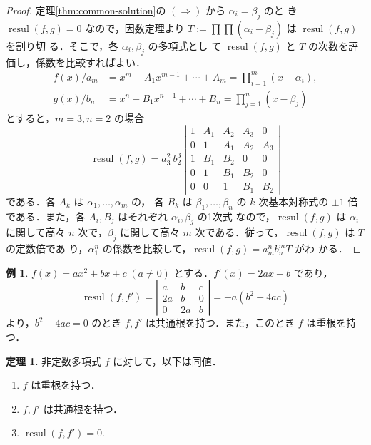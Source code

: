 \documentclass[12pt, uplatex, dvipdfmx]{jsarticle}
\theoremstyle{definition}
\newtheorem{theorem}{定理}
\newtheorem{example}{例}
\DeclareMathOperator{\resul}{resul}
\begin{document}
\begin{proof}
  定理\ref{thm:common-solution}の $(\Rightarrow)$ から $\alpha_i=\beta_j$ のと
  き $\resul(f,g)=0$ なので，因数定理より $T:=\prod \prod (\alpha_i-\beta_j)$ は $\resul(f,g)$ を割り切
  る．そこで，各 $\alpha_i, \beta_j$ の多項式とし
  て $\resul(f,g)$ と $T$ の次数を評価し，係数を比較すればよい．
  \[
    \begin{aligned}
      f(x)/a_m &= x^m + A_{1} x^{m-1} + \cdots + A_m = \prod_{i=1}^{m}(x-\alpha_i),\\
      g(x)/b_n &= x^n + B_{1} x^{n-1} + \cdots + B_n = \prod_{j=1}^{n}(x-\beta_j)
    \end{aligned}
  \]
  とすると，$m=3, n=2$ の場合
  \[
    \resul(f,g) = a_3^2\ b_2^3\ \left|
      \begin{array}{ccccc}
        1 & A_1 & A_2  & A_3 & 0\\
        0 & 1 & A_1 & A_2 & A_3\\
        1 & B_1 & B_2 & 0 & 0 \\
        0 & 1 & B_1 & B_2 & 0\\
        0 & 0 & 1 & B_1 & B_2
      \end{array}
    \right|
  \]
  である．各 $A_k$ は $\alpha_1, \ldots, \alpha_m$ の，
  各 $B_k$ は $\beta_1, \ldots, \beta_n$ の $k$ 次基本対称式の $\pm 1$
  倍である．また，各 $A_i, B_j$ はそれぞれ $\alpha_i, \beta_j$ の1次式
  なので，$\resul(f,g)$ は $\alpha_i$ に関して高々 $n$ 次で，$\beta_j$
  に関して高々 $m$ 次である．従って，$\resul(f,g)$ は $T$ の定数倍であ
  り，$\alpha_1^n$ の係数を比較して，$\resul(f,g) = a_m^n b_n^m T$ がわ
  かる．
\end{proof}

\begin{example}\label{exmp:disc2}
  $f(x) = ax^2+bx+c \; (a \neq 0)$ とする．$f'(x) = 2ax + b$ であり，
  \[
    \resul(f, f') = \left|
      \begin{array}{ccc}
        a & b & c\\
        2a & b & 0\\
        0 & 2a & b
      \end{array}
    \right| =-a (b^2-4ac)
  \]
  より，$b^2-4ac=0$ のとき $f, f'$ は共通根を持つ．また，このとき $f$ は重根を持つ．
\end{example}

\begin{theorem}\label{thm:double-resul}
  非定数多項式 $f$ に対して，以下は同値．
  \begin{enumerate}[(1)]
  \item $f$ は重根を持つ．
  \item $f, f'$ は共通根を持つ．
  \item $\resul(f, f')=0$.
  \end{enumerate}
\end{theorem}
\end{document}
